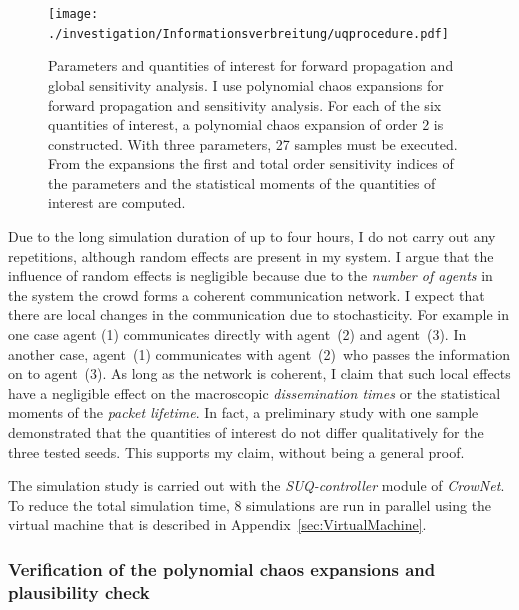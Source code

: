 \begin{figure}[hbt!]
\texttt{[image: ./investigation/Informationsverbreitung/uqprocedure.pdf]} 
\caption[Parameters and quantities of interest for the forward propagation and sensitivity analysis]{Parameters and quantities of interest for forward propagation and global sensitivity analysis. I use polynomial chaos expansions for forward propagation and  sensitivity analysis. For each of the six quantities of interest, a polynomial chaos expansion of order 2 is constructed. With three parameters, 27 samples must be executed. From the expansions the first and total order sensitivity indices of the parameters and the statistical moments of the quantities of interest are computed. }
\label{fig:uqmethodologystudy1}
\end{figure}


Due to the long simulation duration of up to four hours, I do not carry out any repetitions, although random effects are present in my system. I argue that the influence of random effects is negligible 
because due to the \textit{number of agents} in the system the crowd forms a coherent communication network. I expect that there are local changes in the communication due to stochasticity. For example in one case agent (1) communicates directly with agent~(2) and agent~(3). In another case, agent~(1) communicates with agent~(2)~who passes the information on to agent~(3). As long as the network is coherent, I claim that such local effects have a negligible effect on the macroscopic \textit{dissemination times} or the statistical moments of the \textit{packet lifetime}. In fact, a preliminary study with one sample demonstrated that the quantities of interest do not differ qualitatively for the three tested seeds. This supports my claim, without being a general proof.

The simulation study is carried out with the \textit{SUQ-controller} module of \textit{CrowNet}. To reduce the total simulation time, 8 simulations are run in parallel using the virtual machine that is described in Appendix~\ref{sec:VirtualMachine}.





\subsubsection{Verification of the polynomial chaos expansions and plausibility check}
 
